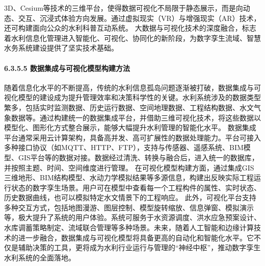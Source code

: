 3D、Cesium等技术的三维平台，使得数据可视化不局限于静态展示，而是向动态、交互、沉浸式体验方向发展。通过虚拟现实（VR）与增强现实（AR）技术，还可构建面向公众的水利科普互动系统。
大数据与可视化技术的深度融合，标志着水利信息化管理进入智能化、可视化、协同化的新阶段，为数字孪生流域、智慧水务系统建设提供了坚实技术基础。 \paragraph{6.3.5.5
数据集成与可视化模型构建方法}\label{ux6570ux636eux96c6ux6210ux4e0eux53efux89c6ux5316ux6a21ux578bux6784ux5efaux65b9ux6cd5-1}
随着信息化水平的不断提高，传统的水利信息孤岛问题逐渐被打破，数据集成与可视化模型的建设成为提升管理效率和决策科学性的关键。水利系统涉及的数据类型繁多，包括实时监测数据、历史运行数据、空间地理数据、工程结构数据、水文气象数据等。通过构建统一的数据集成平台，并借助三维可视化技术，将这些数据以模型化、图形化方式整合展示，能够大幅提升水利管理的智能化水平。
数据集成平台通常采用云计算架构，具备高并发、高可扩展性的数据处理能力。平台可接入多种接口协议（如MQTT、HTTP、FTP），支持与传感器、遥感系统、BIM模型、GIS平台等的数据对接。数据经过清洗、转换与融合后，进入统一的数据库，并按照主题、时间、空间维度进行管理。
在可视化模型构建方面，通过集成GIS三维地形、BIM结构模型、水动力学模拟结果等多源信息，构建出反映实际工程运行状态的数字孪生场景。用户可在模型中查看每一个工程构件的属性、实时状态、历史数据曲线，也可以模拟特定水文情景下的工程响应。
此外，可视化平台支持多种交互方式，包括地图漫游、图层控制、模型旋转缩放、信息弹窗、模拟演示等，极大提升了系统的用户体验。系统可服务于水资源调度、洪水应急预案设计、水库调蓄策略制定、流域联合管理等多种场景。未来，随着人工智能和边缘计算技术的进一步融合，数据集成与可视化模型将具备更高的自动化和智能化水平。它不仅是辅助决策的工具，更将成为水利行业运行与管理的``神经中枢''，推动数字孪生水利系统的全面落地。
